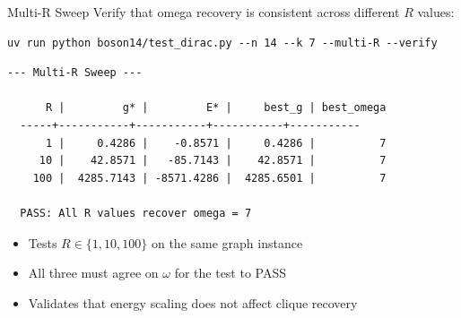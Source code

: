 \documentclass[aspectratio=169]{beamer}
\begin{document}

\begin{frame}[fragile]{Multi-R Sweep}
    Verify that omega recovery is consistent across different $R$ values:

\begin{lstlisting}[style=shell,numbers=none]
uv run python boson14/test_dirac.py --n 14 --k 7 --multi-R --verify
\end{lstlisting}

\begin{lstlisting}[numbers=none,basicstyle=\ttfamily\scriptsize]
--- Multi-R Sweep ---

      R |         g* |         E* |     best_g | best_omega
  -----+-----------+-----------+-----------+-----------
      1 |     0.4286 |    -0.8571 |     0.4286 |          7
     10 |    42.8571 |   -85.7143 |    42.8571 |          7
    100 |  4285.7143 | -8571.4286 |  4285.6501 |          7

  PASS: All R values recover omega = 7
\end{lstlisting}

    \vspace{0.5em}
    \begin{itemize}
        \item Tests $R \in \{1, 10, 100\}$ on the same graph instance
        \item All three must agree on $\omega$ for the test to PASS
        \item Validates that energy scaling does not affect clique recovery
    \end{itemize}
\end{frame}

\end{document}
